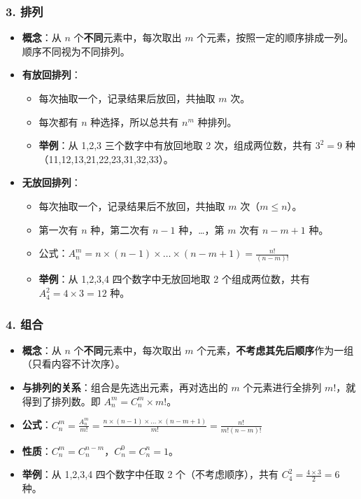 \documentclass[12pt,a4paper]{ctexart}
\begin{document}
\subsubsection{3. 排列}
\begin{itemize}[noitemsep]
    \item \textbf{概念}：从 $n$ 个\textbf{不同}元素中，每次取出 $m$ 个元素，按照一定的顺序排成一列。顺序不同视为不同排列。
    \item \textbf{有放回排列}：
          \begin{itemize}[noitemsep]
              \item 每次抽取一个，记录结果后放回，共抽取 $m$ 次。
              \item 每次都有 $n$ 种选择，所以总共有 $n^m$ 种排列。
              \item \textbf{举例}：从 1,2,3 三个数字中有放回地取 2 次，组成两位数，共有 $3^2=9$ 种（11,12,13,21,22,23,31,32,33）。
          \end{itemize}
    \item \textbf{无放回排列}：
          \begin{itemize}[noitemsep]
              \item 每次抽取一个，记录结果后不放回，共抽取 $m$ 次（$m \le n$）。
              \item 第一次有 $n$ 种，第二次有 $n-1$ 种，…，第 $m$ 次有 $n-m+1$ 种。
              \item 公式：$\displaystyle A_n^m = n \times (n-1) \times \dots \times (n-m+1) = \frac{n!}{(n-m)!}$
              \item \textbf{举例}：从 1,2,3,4 四个数字中无放回地取 2 个组成两位数，共有 $A_4^2 = 4 \times 3 = 12$ 种。
          \end{itemize}
\end{itemize}

\subsubsection{4. 组合}
\begin{itemize}[noitemsep]
    \item \textbf{概念}：从 $n$ 个\textbf{不同}元素中，每次取出 $m$ 个元素，\textbf{不考虑其先后顺序}作为一组（只看内容不计次序）。
    \item \textbf{与排列的关系}：组合是先选出元素，再对选出的 $m$ 个元素进行全排列 $m!$，就得到了排列数。即 $A_n^m = C_n^m \times m!$。
    \item \textbf{公式}：$\displaystyle C_n^m = \frac{A_n^m}{m!} = \frac{n \times (n-1) \times \dots \times (n-m+1)}{m!} = \frac{n!}{m!(n-m)!}$
    \item \textbf{性质}：$C_n^m = C_n^{n-m}$，$C_n^0 = C_n^n = 1$。
    \item \textbf{举例}：从 1,2,3,4 四个数字中任取 2 个（不考虑顺序），共有 $C_4^2 = \frac{4 \times 3}{2} = 6$ 种。
\end{itemize}
\end{document}
